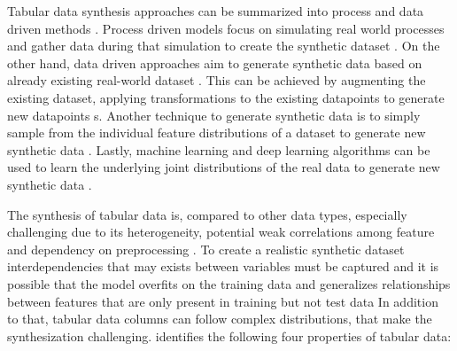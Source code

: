Tabular data synthesis approaches can be summarized into process and data driven methods \cite{goncalves2020GenerationEvaluationSynthetic}.
Process driven models focus on simulating real world processes and gather data during that simulation to create the synthetic dataset \cite{kowalczyk2022TaxonomyUseSynthetic}.
On the other hand, data driven approaches aim to generate synthetic data based on already existing real-world dataset \cite{kowalczyk2022TaxonomyUseSynthetic}.
This can be achieved by augmenting the existing dataset, \ie applying transformations to the existing datapoints to generate new datapoints \cite{kowalczyk2022TaxonomyUseSynthetic}s.
Another technique to generate synthetic data is to simply sample from the individual feature distributions of a dataset to generate new synthetic data \cite{kowalczyk2022TaxonomyUseSynthetic}.
Lastly, machine learning and deep learning algorithms can be used to learn the underlying joint distributions of the real data to generate new synthetic data \cite{kowalczyk2022TaxonomyUseSynthetic}. 

The synthesis of tabular data is, compared to other data types, especially challenging due to its heterogeneity, potential weak correlations among feature and dependency on preprocessing \cite{borisov2022DeepNeuralNetworks, yoon2020VIMEExtendingSuccess, gorishniy2022EmbeddingsNumericalFeatures}.
To create a realistic synthetic dataset interdependencies that may exists between variables must be captured and 
it is possible that the \gls{model} overfits on the training data and generalizes relationships between features that are only present in training but not test data \cite{lederrey2022DATGANIntegratingExperta}
In addition to that, tabular data columns can follow complex distributions, that make the synthesization challenging.
\cite{zhao2022CTABGANEnhancingTabular} identifies the following four properties of tabular data:

